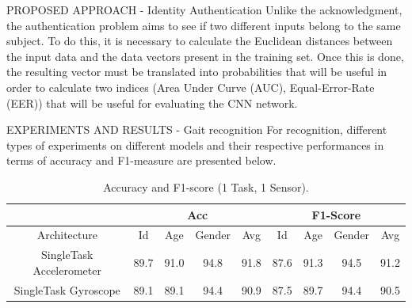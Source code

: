 \documentclass[10pt]{beamer}
\begin{document}
\begin{frame}{PROPOSED APPROACH - Identity Authentication}
    Unlike the acknowledgment, the authentication problem aims to see if 
    two different inputs belong to the same subject. To do this, it is necessary 
    to calculate the Euclidean distances between the input data and the data 
    vectors present in the training set. Once this is done, the resulting vector 
    must be translated into probabilities that will be useful in order to 
    calculate two indices (Area Under Curve (AUC), Equal-Error-Rate 
    (EER)) that will be useful for evaluating the CNN network.
\end{frame}

\begin{frame}{EXPERIMENTS AND RESULTS - Gait recognition}
    For recognition, different types of experiments on different models and 
    their respective performances in terms of accuracy and F1-measure are 
    presented below.
    \begin{minipage}{\linewidth}
        \centering
        \begin{minipage}{0.45\linewidth}
            \begin{table}[h!]
            \centering
                \begin{adjustbox}{max width=\textwidth}
                \begin{tabular}{|c||ccc|c||ccc|c|}
                    \hline
                        & \multicolumn{4}{c||}{Acc} & \multicolumn{4}{c|}{F1-Score} \\
                    \hline
                        Architecture & Id & Age & Gender & Avg & Id & Age & Gender & Avg\\
                    \hline
                        SingleTask Accelerometer & 89.7 & 91.0 & 94.8 & 91.8 & 87.6 & 91.3 & 94.5 & 91.2\\
                        SingleTask Gyroscope& 89.1 & 89.1 & 94.4 & 90.9 & 87.5 & 89.7 & 94.4 & 90.5\\
                    \hline 
                \end{tabular}
                \end{adjustbox}
                \caption{Accuracy and F1-score (1 Task, 1 Sensor).}
                \label{table accuracy and F1 (1 Task - 1 Sensor)}
            \end{table}
            \centering
            \begin{table}[h!]
                \centering
                \begin{adjustbox}{max width=\textwidth}

\end{adjustbox}
\end{table}
\end{minipage}
\end{minipage}
\end{frame}
\end{document}
